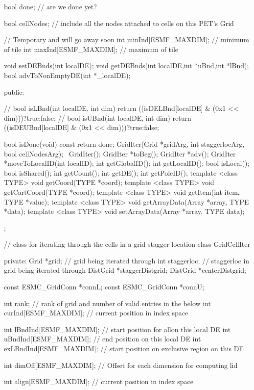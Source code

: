 {{     bool done; // are we done yet?
 
     bool cellNodes; // include all the nodes attached to cells on this PET's Grid
 
     // Temporary and will go away soon
     int minInd[ESMF_MAXDIM];  // minimum of tile
     int maxInd[ESMF_MAXDIM];  // maximum of tile
 
 
     void setDEBnds(int localDE);
     void getDEBnds(int localDE,int *uBnd,int *lBnd);
     bool advToNonEmptyDE(int *_localDE);
 
   public:
 
     // bool isLBnd(int localDE, int dim) {return ((isDELBnd[localDE] & (0x1 << dim)))?true:false;}
     // bool isUBnd(int localDE, int dim) {return ((isDEUBnd[localDE] & (0x1 << dim)))?true:false;}
 
     bool isDone(void) const {return done;}
   GridIter(Grid *gridArg, int  staggerlocArg, bool cellNodesArg);
   ~GridIter();
   GridIter *toBeg();
   GridIter *adv();
   GridIter *moveToLocalID(int localID);
   int getGlobalID();
   int getLocalID();
   bool isLocal();
   bool isShared();
   int getCount();
   int getDE();
   int getPoleID();
   template <class TYPE> void getCoord(TYPE *coord);
   template <class TYPE> void getCartCoord(TYPE *coord);
   template <class TYPE> void getItem(int item, TYPE *value);
   template <class TYPE> void getArrayData(Array *array, TYPE *data);
   template <class TYPE> void setArrayData(Array *array, TYPE data);
   }; 
 
 
    // class for iterating through the cells in a grid stagger location
   class GridCellIter {
   private:
     Grid *grid;     // grid being iterated through
     int staggerloc; // staggerloc in grid being iterated through
     DistGrid *staggerDistgrid;
     DistGrid *centerDistgrid;
 
     const ESMC_GridConn *connL;
     const ESMC_GridConn *connU;
     
     int rank; // rank of grid and number of valid entries in the below
     int curInd[ESMF_MAXDIM];  // current position in index space
 
     int lBndInd[ESMF_MAXDIM]; // start position for allon this local DE  
     int uBndInd[ESMF_MAXDIM]; // end position on this local DE  
     int exLBndInd[ESMF_MAXDIM]; // start position on exclusive region on this DE
 
     int dimOff[ESMF_MAXDIM]; // Offset for each dimension for computing lid
 
     int align[ESMF_MAXDIM];  // current position in index space
 
}}
